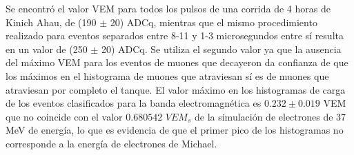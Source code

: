 \documentclass{book}
\begin{document}
Se encontr\'o el valor VEM para todos los pulsos de una corrida de 4 horas de Kinich Ahau, de (190 $\pm$ 20) ADCq, mientras que el mismo procedimiento realizado para eventos separados entre 8-11 y 1-3 microsegundos entre s\'i resulta en un valor de (250 $\pm$ 20) ADCq. Se utiliza el segundo valor ya que la ausencia del m\'aximo VEM para los eventos de muones que decayeron da confianza de que los m\'aximos en el histograma de muones que atraviesan s\'i es de muones que atraviesan por completo el tanque. El valor m\'aximo en los histogramas de carga  de los eventos clasificados para la banda electromagn\'etica es $0.232 \pm 0.019$ VEM que no coincide con el valor $0.680542$ $VEM_s$ de la simulaci\'on de electrones de 37 MeV de energ\'ia, lo que es evidencia de que el primer pico de los histogramas no corresponde a la energ\'ia de electrones de Michael.

\end{document}
